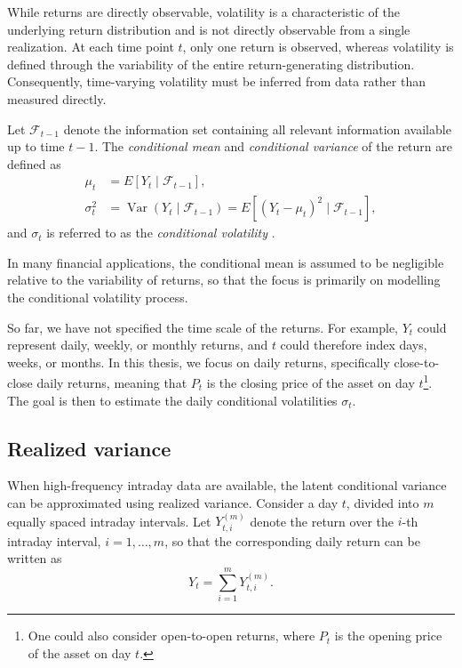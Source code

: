 While returns are directly observable, volatility is a characteristic of the underlying return distribution and is not directly observable from a single realization. At each time point $t$, only one return is observed, whereas volatility is defined through the variability of the entire return-generating distribution. Consequently, time-varying volatility must be inferred from data rather than measured directly.

\begin{definition}
    Let $\mathcal{F}_{t-1}$ denote the information set containing all relevant information available up to time $t-1$. The \emph{conditional mean} and \emph{conditional variance} of the return are defined as
    \begin{align}
        \mu_t &= E[Y_t \mid \mathcal{F}_{t-1}], \\
        \sigma_t^2 &= \operatorname{Var}(Y_t \mid \mathcal{F}_{t-1}) = E[(Y_t - \mu_t)^2 \mid \mathcal{F}_{t-1}],
    \end{align}
    and $\sigma_t$ is referred to as the \emph{conditional volatility} \cite{andersen2006volatility}.
\end{definition}

In many financial applications, the conditional mean is assumed to be negligible relative to the variability of returns, so that the focus is primarily on modelling the conditional volatility process.

So far, we have not specified the time scale of the returns. For example, $Y_t$ could represent daily, weekly, or monthly returns, and $t$ could therefore index days, weeks, or months.
In this thesis, we focus on daily returns, specifically close-to-close daily returns, meaning that $P_t$ is the closing price of the asset on day $t$\footnote{One could also consider open-to-open returns, where $P_t$ is the opening price of the asset on day $t$.}.
The goal is then to estimate the daily conditional volatilities $\sigma_t$. 

\subsection{Realized variance}
\label{sec:realized_variance}
When high-frequency intraday data are available, the latent conditional variance can be approximated using realized variance. Consider a day $t$, divided into $m$ equally spaced intraday intervals. Let $Y_{t,i}^{(m)}$ denote the return over the $i$-th intraday interval, $i = 1, \ldots, m$, so that the corresponding daily return can be written as
\begin{equation}
    Y_t = \sum_{i=1}^{m} Y_{t,i}^{(m)}.
\end{equation}


